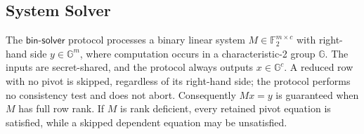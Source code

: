 

\subsection{System Solver}\label{sec:solver}

The $\textsf{bin-solver}$ protocol processes a binary linear system
$M \in \mathbb{F}_2^{m \times c}$ with right-hand side
$y \in \mathbb{G}^m$, where computation occurs in a characteristic-2 group
$\mathbb{G}$.  The inputs are secret-shared, and the protocol always outputs
$x \in \mathbb{G}^c$.  A reduced row with no pivot is skipped, regardless of
its right-hand side; the protocol performs no consistency test and does not
abort.  Consequently $Mx=y$ is guaranteed when $M$ has full row rank.  If $M$
is rank deficient, every retained pivot equation is satisfied, while a skipped
dependent equation may be unsatisfied.

